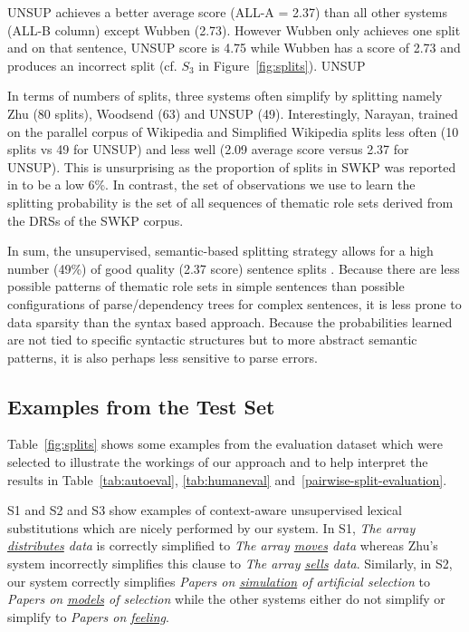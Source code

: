 \documentclass[11pt,a4paper]{article}
\newcommand{\nlang}[1]{{\it #1}}
\begin{document}
UNSUP achieves a better average score (ALL-A = 2.37) than all other
systems (ALL-B column) except Wubben (2.73). However Wubben only
achieves one split and on that sentence, UNSUP score is 4.75 while
Wubben has a score of 2.73 and produces an incorrect split (cf. $S_3$
in Figure~\ref{fig:splits}). UNSUP

In terms of numbers of splits, three systems often simplify by
splitting namely Zhu (80 splits), Woodsend (63) and UNSUP (49).
Interestingly, Narayan, trained on the parallel corpus of Wikipedia
and Simplified Wikipedia splits less often (10 splits vs 49 for UNSUP)
and less well (2.09 average score versus 2.37 for UNSUP). This is
unsurprising as the proportion of splits in SWKP was reported in
\cite{narayan2014hybrid} to be a low 6\%. In contrast, the set of
observations we use to learn the splitting probability is the set of
all sequences of thematic role sets derived from the DRSs of the SWKP
corpus.

In sum, the unsupervised, semantic-based splitting strategy allows for
a high number (49\%) of good quality (2.37 score) sentence splits .
Because there are less possible patterns of thematic role sets in
simple sentences than possible configurations of parse/dependency
trees for complex sentences, it is less prone to data sparsity than
the syntax based approach. Because the probabilities learned are not
tied to specific syntactic structures but to more abstract semantic
patterns, it is also perhaps less sensitive to parse errors.

\subsection{Examples from the Test Set}

Table~\ref{fig:splits} shows some examples from the evaluation
dataset which were selected to illustrate the workings of our approach
and to help interpret the results in
Table~\ref{tab:autoeval}, \ref{tab:humaneval}
and~\ref{pairwise-split-evaluation}.

S1 and S2 and S3 show examples of context-aware unsupervised lexical
substitutions which are nicely performed by our system. In S1,
\nlang{The array \underline{distributes} data} is correctly simplified
to \nlang{The array \underline{moves} data} whereas
Zhu's system incorrectly simplifies this clause to \nlang{The array
  \underline{sells} data}. Similarly, in S2, our system correctly simplifies
\nlang{Papers on \underline{simulation} of artificial selection} to
\nlang{Papers on \underline{models} of selection} while the other
systems either do not simplify or simplify to \nlang{Papers on
  \underline{feeling}}.
\end{document}
